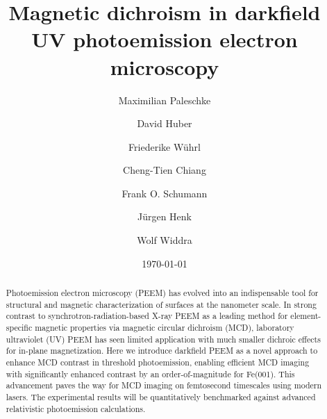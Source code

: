 \documentclass[prl,twocolumn,floatfix,superscriptaddress,aps]{revtex4-2}
\begin{document}
\title{Magnetic dichroism in darkfield UV photoemission electron microscopy}
\author{Maximilian Paleschke}
\author{David Huber}
\author{Friederike W\"{u}hrl}

\author{Cheng-Tien Chiang}

\author{Frank O. Schumann}

\author{J\"{u}rgen Henk}
\author{Wolf Widdra}


\date{\today}

\begin{abstract}
    Photoemission electron microscopy (PEEM) has evolved into an indispensable tool for structural and magnetic characterization of surfaces at the nanometer scale. In strong contrast to synchrotron-radiation-based X-ray PEEM as a leading method for element-specific magnetic properties via magnetic circular dichroism (MCD), laboratory ultraviolet (UV) PEEM has seen limited application with much smaller dichroic effects for in-plane magnetization. Here we introduce darkfield PEEM as a novel approach to enhance MCD contrast in threshold photoemission, enabling efficient MCD imaging with significantly enhanced contrast by an order-of-magnitude for Fe(001). This advancement paves the way for
    MCD imaging on femtosecond timescales using modern lasers. The experimental results will be quantitatively benchmarked against advanced relativistic photoemission calculations.
\end{abstract}

\pacs{}
\end{document}
